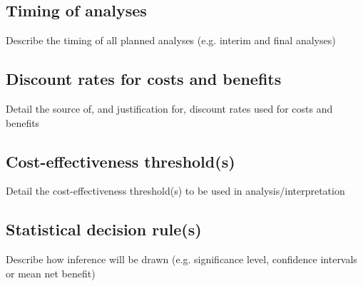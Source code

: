 \subsection{Timing of analyses}

Describe the timing of all planned analyses (e.g. interim and final
analyses)


\subsection{Discount rates for costs and benefits}

Detail the source of, and justification for, discount rates used for
costs and benefits



\subsection{Cost-effectiveness threshold(s)}

Detail the cost-effectiveness threshold(s) to be used in
analysis/interpretation


\subsection{Statistical decision rule(s)}

Describe how inference will be drawn (e.g. significance level,
confidence intervals or mean net benefit)



